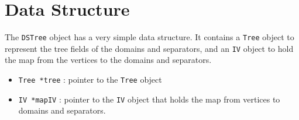\par
\section{Data Structure}
\label{section:DSTree:dataStructure}
\par
The {\tt DSTree} object has a very simple data structure.
It contains a {\tt Tree} object to represent the tree fields
of the domains and separators, and an {\tt IV} object to hold the
map from the vertices to the domains and separators.
\begin{itemize}
\item {\tt Tree *tree} :  pointer to the {\tt Tree} object 
\item {\tt IV *mapIV} : pointer to the {\tt IV} object that holds
the map from vertices to domains and separators.
\end{itemize}
